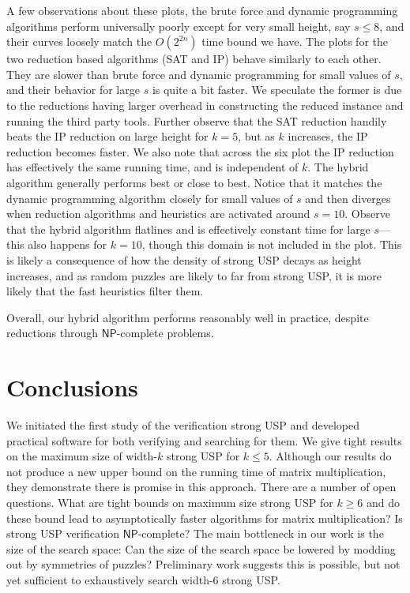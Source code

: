 \documentclass[11pt]{article}
\renewcommand\NP{\ensuremath{\mathsf{NP}}}
\begin{document}
A few observations about these plots, the brute force and dynamic
programming algorithms perform universally poorly except for very
small height, say $s \le 8$, and their curves loosely match the
$O(2^{2n})$ time bound we have.  The plots for the two reduction based
algorithms (SAT and IP) behave similarly to each other.  They are
slower than brute force and dynamic programming for small values of
$s$, and their behavior for large $s$ is quite a bit faster.  We
speculate the former is due to the reductions having larger overhead
in constructing the reduced instance and running the third party tools.
Further observe that the SAT reduction handily beats the IP reduction
on large height for $k = 5$, but as $k$ increases, the IP reduction
becomes faster.  We also note that across the six plot the IP
reduction has effectively the same running time, and is independent of
$k$.  The hybrid algorithm generally performs best or close
to best.  Notice that it matches the dynamic programming algorithm
closely for small values of $s$ and then diverges when reduction
algorithms and heuristics are activated around $s = 10$.  Observe that
the hybrid algorithm flatlines and is effectively constant time for
large $s$---this also happens for $k = 10$, though this domain is not
included in the plot.  This is likely a consequence of how the density
of strong USP decays as height increases, and as random puzzles are
likely to far from strong USP, it is more likely that the fast
heuristics filter them.

Overall, our hybrid algorithm performs reasonably well in practice,
despite reductions through \NP{}-complete problems.




\section{Conclusions}
\label{sec:conclusion}

We initiated the first study of the verification strong USP and
developed practical software for both verifying and searching for
them.  We give tight results on the maximum size of width-$k$
strong USP for $k \le 5$.  Although our results do not produce a new
upper bound on the running time of matrix multiplication, they
demonstrate there is promise in this approach. %
There are a number of open questions.
What are tight bounds on maximum size
strong USP for $k \ge 6$ and do these bound lead to asymptotically
faster algorithms for matrix multiplication?
Is strong USP verification \NP-complete?
The main bottleneck in
our work is the size of the search space:
Can the size of the search space be lowered by modding out by symmetries of puzzles?  Preliminary work
suggests this is possible, but not yet sufficient to exhaustively
search width-6 strong USP.
\end{document}
